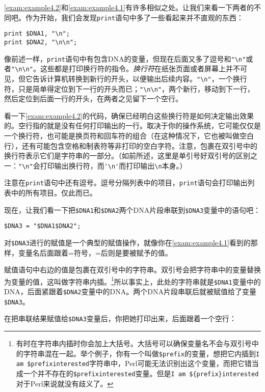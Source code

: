 \autoref{exam:example4.2}和\autoref{exam:example4.1}有许多相似之处。让我们来看一下两者的不同吧。作为开始，我们会发现\verb|print|语句中多了一些看起来并不直观的东西：

\begin{lstlisting}
print $DNA1, "\n";
print $DNA2, "\n\n";
\end{lstlisting}

像前述一样，\verb|print|语句中有包含DNA的变量，但现在后面又多了逗号和\verb|"\n"|或者\verb|"\n\n"|。这些都是打印换行符的指令。\textit{换行符}在纸张页面或者屏幕上并不可见，但它告诉计算机转换到新行的开头，以便输出后续内容。\verb|"\n"|，一个换行符，只是简单得定位到下一行的开头而已；\verb|"\n\n"|，两个新行，移动到下一行，然后定位到后面一行的开头，在两者之见留下一个空行。

看一下\autoref{exam:example4.2}的代码，确保已经明白这些换行符是如何决定输出效果的。空行指的就是没有任何打印输出的一行。取决于你的操作系统，它可能仅仅是一个换行符，也可能是换页符和回车符的组合（在这种情况下，它也被叫做空白行），还有可能包含空格和制表符等非打印的空白字符。注意，包裹在双引号中的换行符表示它们是字符串的一部分。（如前所述，这里是单引号好双引号的区别之一：\verb|"\n"|会打印输出换行符，而\verb|'\n'|而打印输出\verb|\n|本身。）

注意在\verb|print|语句中还有逗号。逗号分隔列表中的项目，\verb|print|语句会打印输出列表中的所有项目。仅此而已。

现在，让我们看一下把\verb|$DNA1|和\verb|$DNA2|两个DNA片段串联到\verb|$DNA3|变量中的语句吧：

\begin{lstlisting}
$DNA3 = "$DNA1$DNA2"; 
\end{lstlisting}

对\verb|$DNA3|进行的赋值是一个典型的赋值操作，就像你在\autoref{exam:example4.1}看到的那样，变量名后面跟着=符号，=后则是要被赋予的值。

赋值语句中右边的值是包裹在双引号中的字符串。双引号会把字符串中的变量替换为变量的值，这叫做字符串内插。\footnote{有时在字符串内插时你会加上大括号。大括号可以确保变量名不会与双引号中的字符串混在一起。举个例子，你有一个叫做\verb|$prefix|的变量，想把它内插到\verb|I am $prefixinterested|字符串中，Perl可能无法识别出这个变量，而把它错当成一个并不存在的\verb|$prefixinterested|变量。但是\verb|I am ${prefix}interested|对于Perl来说就没有歧义了。}所以事实上，此处的字符串就是\verb|$DNA1|变量中的DNA，后面紧跟着\verb|$DNA2|变量中的DNA。两个DNA片段串联后就被赋值给了变量\verb|$DNA3|。

在把串联结果赋值给\verb|$DNA3|变量后，你把她打印出来，后面跟着一个空行：


